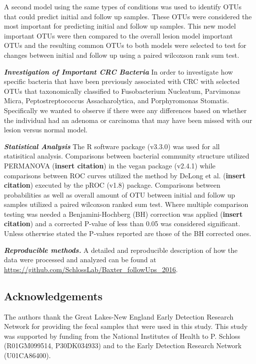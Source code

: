 \documentclass[12pt,]{article}
\begin{document}
A second model using the same types of conditions was used to identify
OTUs that could predict initial and follow up samples. These OTUs were
considered the most important for predicting initial and follow up
samples. This new model important OTUs were then compared to the overall
lesion model important OTUs and the resulting common OTUs to both models
were selected to test for changes between initial and follow up using a
paired wilcoxson rank sum test.

\textbf{\emph{Investigation of Important CRC Bacteria}} In order to
investigate how specific bacteria that have been previously associated
with CRC with selected OTUs that taxonomically classified to
Fusobacterium Nucleatum, Parvimonas Micra, Peptostreptococcus
Assacharolytica, and Porphyromonas Stomatis. Specifically we wanted to
observe if there were any differences based on whether the individual
had an adenoma or carcinoma that may have been missed with our lesion
versus normal model.

\textbf{\emph{Statistical Analysis}} The R software package (v3.3.0) was
used for all statisitical analysis. Comparisons between bacterial
community structure utilized PERMANOVA (\textbf{insert citation}) in the
vegan package (v2.4.1) while comparisons between ROC curves utilized the
method by DeLong et al. (\textbf{insert citation}) executed by the pROC
(v1.8) package. Comparisons between probabilities as well as overall
amount of OTU between initial and follow up samples utilized a paired
wilcoxson ranked sum test. Where multiple comparison testing was needed
a Benjamini-Hochberg (BH) correction was applied (\textbf{insert
citation}) and a corrected P-value of less than 0.05 was considered
significant. Unless otherwise stated the P-values reported are those of
the BH corrected ones.

\textbf{\emph{Reproducible methods.}} A detailed and reproducible
description of how the data were processed and analyzed can be found at
\url{https://github.com/SchlossLab/Baxter_followUps_2016}.

\newpage

\subsection{Acknowledgements}\label{acknowledgements}

The authors thank the Great Lakes-New England Early Detection Research
Network for providing the fecal samples that were used in this study.
This study was supported by funding from the National Institutes of
Health to P. Schloss (R01GM099514, P30DK034933) and to the Early
Detection Research Network (U01CA86400).
\end{document}
